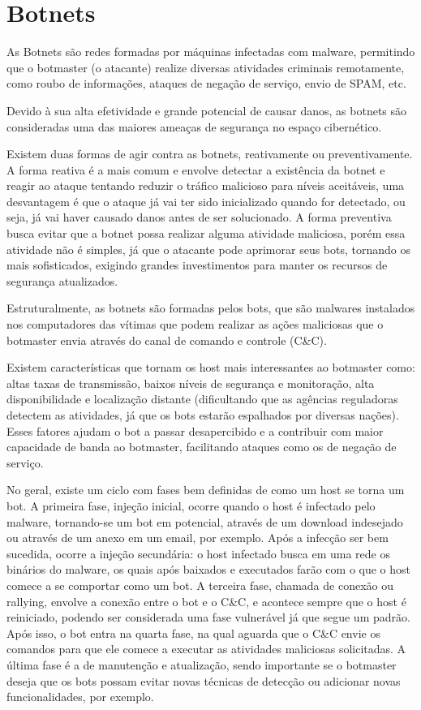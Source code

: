 \chapter{Botnets}
As Botnets são redes formadas por máquinas infectadas com malware, permitindo que o botmaster (o atacante) realize diversas atividades criminais remotamente, como roubo de informações, ataques de negação de serviço, envio de SPAM, etc.\cite{silva2013botnets}

Devido à sua alta efetividade e grande potencial de causar danos, as botnets são consideradas uma das maiores ameaças de segurança no espaço cibernético.

Existem duas formas de agir contra as botnets, reativamente ou preventivamente. A forma reativa é a mais comum e envolve detectar a existência da botnet e reagir ao ataque tentando reduzir o tráfico malicioso para níveis aceitáveis, uma desvantagem é que o ataque já vai ter sido inicializado quando for detectado, ou seja, já vai haver causado danos antes de ser solucionado. A forma preventiva busca evitar que a botnet possa realizar alguma atividade maliciosa, porém essa atividade não é simples, já que o atacante pode aprimorar seus bots, tornando os mais sofisticados, exigindo grandes investimentos para manter os recursos de segurança atualizados.

Estruturalmente, as botnets são formadas pelos bots, que são malwares instalados nos computadores das vítimas que podem realizar as ações maliciosas que o botmaster envia através do canal de comando e controle (C\&C).

Existem características que tornam os host mais interessantes ao botmaster como: altas taxas de transmissão, baixos níveis de segurança e monitoração, alta disponibilidade e localização distante (dificultando que as agências reguladoras detectem as atividades, já que os bots estarão espalhados por diversas nações). Esses fatores ajudam o bot a passar desapercibido e a contribuir com maior capacidade de banda ao botmaster, facilitando ataques como os de negação de serviço.

No geral, existe um ciclo com fases bem definidas de como um host se torna um bot. A primeira fase, injeção inicial, ocorre quando o host é infectado pelo malware, tornando-se um bot em potencial, através de um download indesejado ou através de um anexo em um email, por exemplo. Após a infecção ser bem sucedida, ocorre a injeção secundária: o host infectado busca em uma rede os binários do malware, os quais após baixados e executados farão com o que o host comece a se comportar como um bot. A terceira fase, chamada de conexão ou rallying, envolve a conexão entre o bot e o C\&C, e acontece sempre que o host é reiniciado, podendo ser considerada uma fase vulnerável já que segue um padrão. Após isso, o bot entra na quarta fase, na qual aguarda que o C\&C envie os comandos para que ele comece a executar as atividades maliciosas solicitadas. A última fase é a de manutenção e atualização, sendo importante se o botmaster deseja que os bots possam evitar novas técnicas de detecção ou adicionar novas funcionalidades, por exemplo.

